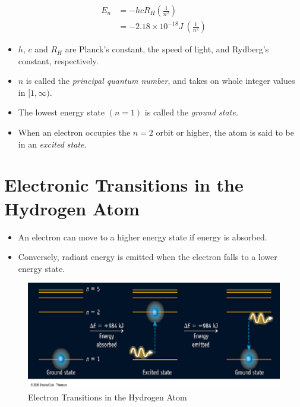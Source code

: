 \documentclass[
	chapter=7,
	title={Quantum Theory {\&} the Electronic Structure of Atoms},
	showanswers=true,
]{chem122notes}
\begin{document}
\begin{minipage}[m]{0.45\textwidth}
	\begin{equation}
		\begin{aligned}
			E_{n} &= -hcR_{H}\left( \frac{1}{n^{2}} \right)\\
			&= -2.18 \times 10^{-18} J\ \left( \frac{1}{n^{2}} \right)
		\end{aligned}
		\label{eq:bohr-energy-state}
	\end{equation}
	\begin{itemize}
		\item $h$, $c$ and $R_{H}$ are Planck's constant, the speed of light, and Rydberg's constant, respectively.
		\item $n$ is called the \emph{principal quantum number}, and takes on whole integer values in $[1, \infty)$.
		\item The lowest energy state $(n=1)$ is called the \emph{ground state.}
		\item When an electron occupies the $n=2$ orbit or higher, the atom is said to be in an \emph{excited state}.
	\end{itemize}
\end{minipage}

\section{Electronic Transitions in the Hydrogen Atom}\label{sec:electronic-transitions-in-the-hydrogen-atom}
\begin{itemize}
	\item An electron can move to a higher energy state if energy is absorbed.
	\item Conversely, radiant energy is emitted when the electron falls to a lower energy state.
\end{itemize}

\begin{figure}[H]
	\centering
	\includegraphics[width=\textwidth]{chapter7/electron_transitions}
	\caption{Electron Transitions in the Hydrogen Atom}
	\label{fig:electron-transitions}
\end{figure}
\end{document}
